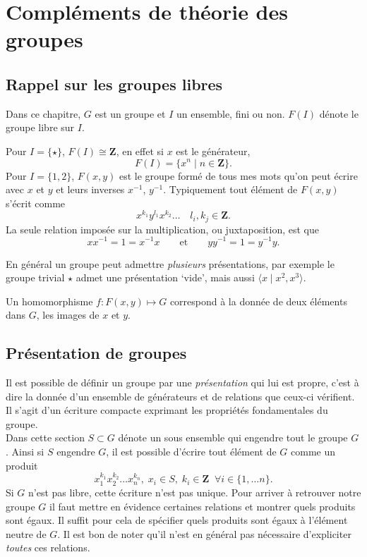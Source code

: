 \documentclass[main.tex]{subfiles}
\begin{document}
	\chapter{Compléments de théorie des groupes}
	\section{Rappel sur les groupes libres}

	Dans ce chapitre, $G$ est un groupe et $I$ un ensemble, fini ou non. $F(I)$ dénote le groupe libre sur $I$. 
	\begin{example}
		Pour $I = \{\star\}$, $F(I) \cong \mathbf{Z}$, en effet si $x$ est le générateur, $$F(I) = \{x^{n} \;|\; n \in \mathbf{Z}\}.$$
		Pour $I = \{1,2\}$, $F(x,y)$ est le groupe formé de tous mes mots qu'on peut écrire avec $x$ et $y$ et leurs inverses $x^{-1}$, $y^{-1}$. Typiquement tout élément de $F(x,y)$ s'écrit comme  \[
		x^{k_1}y^{l_1}x^{k_2}\ldots \quad l_i, k_j \in \mathbf{Z} 
		.\] 
		La seule relation imposée sur la multiplication, ou juxtaposition, est que \[
			xx^{-1} = 1 = x^{-1}x \qquad \text{et} \qquad yy^{-1} = 1 = y^{-1}y
		.\] 
	\begin{remark}
		En général un groupe peut admettre \emph{plusieurs} présentations, par exemple le groupe trivial $\star$ admet une présentation `vide', mais aussi $\langle x \;|\; x^2,x^3 \rangle$.
	\end{remark}
	\end{example}
	\begin{prop}
		Un homomorphisme $f : F(x,y) \longmapsto G$ correspond à la donnée de deux éléments dans $G$, les images de $x$ et $y$.
	\end{prop}
	\section{Présentation de groupes}
	Il est possible de définir un groupe par une \emph{présentation} qui lui est propre, c'est à dire la donnée d'un ensemble de générateurs et de relations que ceux-ci vérifient. Il s'agit d'un écriture compacte exprimant les propriétés fondamentales du groupe. \\
	Dans cette section $S \subset G$ dénote un sous ensemble qui engendre tout le groupe $G$. Ainsi si $S$ engendre $G$, il est possible d'écrire tout élément de $G$ comme un produit  \[
	x_1^{k_1}x_2^{k_2}\ldots x_n^{k_n}, \; x_i \in S, \; k_i \in \mathbf{Z} \; \; \forall i \in \{1,\ldots n\} 
	.\] 
	Si $G$ n'est pas libre, cette écriture n'est pas unique. Pour arriver à retrouver notre groupe $G$ il faut mettre en évidence certaines relations et montrer quels produits sont égaux. Il suffit pour cela de spécifier quels produits sont égaux à l'élément neutre de $G$. Il est bon de noter qu'il n'est en général pas nécessaire d'expliciter \emph{toutes} ces relations.
\end{document}
